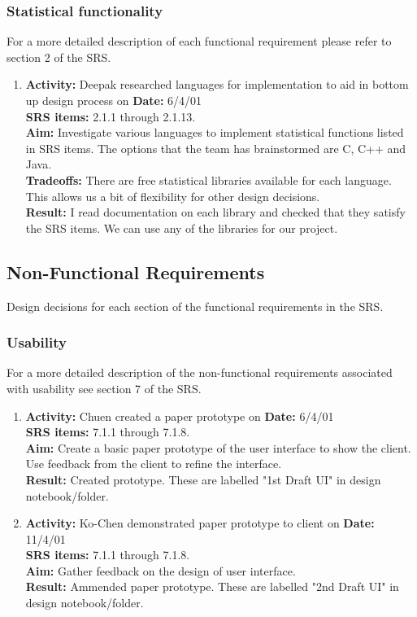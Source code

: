\documentclass[22pt, a4paper]{article}
\begin{document}
\begin{Large}
\subsubsection{Statistical functionality}
For a more detailed description of each functional requirement please refer
to section 2 of the SRS.
\begin{enumerate}
\item
{\bf Activity:} Deepak researched languages for implementation to aid in
bottom up design process on {\bf Date:} 6/4/01 \\
{\bf SRS items:} 2.1.1 through 2.1.13. \\
{\bf Aim:} Investigate various languages to implement statistical functions
listed in SRS items.  The options that the team has brainstormed are C, C++
and Java. \\
{\bf Tradeoffs:} There are free statistical libraries available for each
language.  This allows us a bit of flexibility for other design decisions.\\ 
{\bf Result:} I read documentation on each library and checked that they
satisfy the SRS items.  We can use any of the libraries for our project.
\end{enumerate}

\pagebreak

\subsection{Non-Functional Requirements}

Design decisions for each section of the functional requirements in the SRS.

\subsubsection{Usability}
For a more detailed description of the non-functional requirements
associated with usability see section 7 of the SRS. \\
\begin{enumerate}
\item
{\bf Activity:} Chuen created a paper prototype on {\bf Date:} 6/4/01 \\
{\bf SRS items:} 7.1.1 through 7.1.8. \\
{\bf Aim:} Create a basic paper prototype of the user interface to show the
client.  Use feedback from the client to refine the interface. \\
{\bf Result:} Created prototype.  These are labelled "1st Draft UI" in
design notebook/folder. \\
\item
{\bf Activity:} Ko-Chen demonstrated paper prototype to client on {\bf
Date:} 11/4/01 \\
{\bf SRS items:} 7.1.1 through 7.1.8. \\
{\bf Aim:} Gather feedback on the design of user interface. \\
{\bf Result:} Ammended paper prototype.  These are labelled "2nd Draft UI"
in design notebook/folder. \\
\end{enumerate}

\end{Large}
\end{document}
